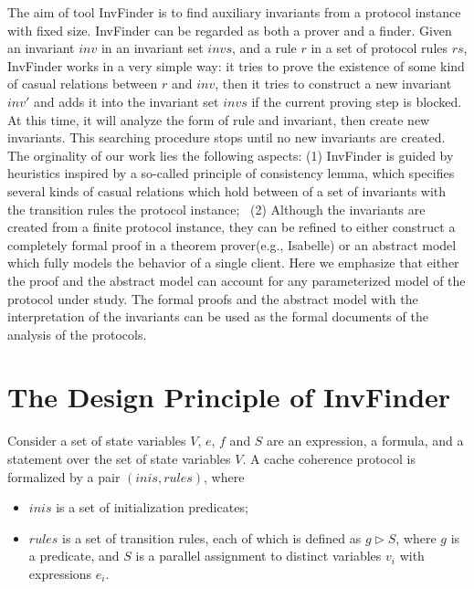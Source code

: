 \documentclass{llncs}
\begin{document}
The aim of tool {\sf InvFinder} is to find auxiliary invariants from
a protocol instance with fixed size. {\sf InvFinder} can be regarded
as both a  prover and a finder. Given an invariant $inv$ in an
invariant set $invs$, and a rule $r$ in a set of protocol rules
$rs$, {\sf InvFinder} works in a very simple way:  it tries to prove
the existence of some kind of casual relations between $r$ and
$inv$, then it tries to construct a new invariant $inv'$ and adds it
into the invariant set $invs$ if the current proving step is
blocked. At this time, it will analyze the form of rule and
invariant, then create new invariants. This searching procedure
stops until no new invariants are created. The orginality of our
work lies the following aspects: (1) {\sf InvFinder} is guided by
heuristics inspired by a so-called principle of consistency lemma,
which specifies several kinds of  casual relations which hold
between  of a set of invariants with the transition rules the
protocol instance;~\cite{LiCache13} (2) Although the invariants are
created from a finite protocol instance, they can be refined to
either construct a completely formal proof in a theorem prover(e.g.,
Isabelle) or an abstract model which fully models the behavior of a
single client. Here we emphasize that either the proof and the
abstract model can account for any parameterized model of the
protocol under study. The formal proofs and the abstract model with
the interpretation of the invariants can be used as the formal
documents of the analysis of the protocols.

\section{The Design Principle of {\sf InvFinder}}
Consider a set of state variables $V$,
$e$, $f$ and $S$ are an expression, a formula, and a statement over
the set of state variables $V$. A cache coherence protocol is formalized by a pair $(inis,rules)$,
where
%
\begin{itemize}
\item $inis $ is a set of initialization predicates;

\item $rules$ is a set of transition rules, each of which is defined as
  $g \vartriangleright  S$, where $g$ is a predicate, and $S$ is a
  parallel assignment to distinct  variables $v_i$ with expressions
  $e_i$.
\end{itemize}
\end{document}

